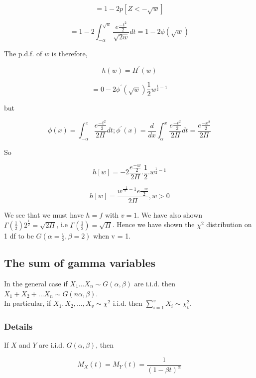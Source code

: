 \documentclass[12pt,a4paper]{article}
\theoremstyle{regla}
\theoremstyle{remark}
\theoremstyle{definition}
\theoremstyle{nonumberbreak}
\begin{document}
$$ = 1-2p [Z< - \sqrt{w}]$$

$$ = 1 - 2  \int_{-\alpha}^{\sqrt{w}} \frac{e \frac{-t^2}{2}} {\sqrt{2w}} dt = 1 - 2\phi (\sqrt{w})$$
 

The p.d.f. of $w$ is therefore,

$$h(w) = H ^\prime(w)$$

$$ = 0 - 2\phi ^\prime (\sqrt{w}) \frac{1} {2} w ^ {\frac{1} {2} -1}$$

but 

$$ \phi (x) = \int_{-\alpha}^{x} \frac{e \frac{-t^2}{2}} {2\Pi} dt ; \phi ^\prime (x) = \frac {d}{dx}\int_{\alpha}^{x}\frac{e \frac{-t^2}{2}} {2\Pi} dt = \frac{e \frac{-x^2}{2}} {2\Pi}$$

So 

$$ h[w] =  -2 \frac{e \frac{-w}{2}} {2\Pi}. \frac {1} {2} . w^{\frac {1}{2} -1} $$

 

$$ h[w] = \frac{w^ {\frac{-1}{2}-1} e \frac{-w}{2}} {2\Pi}, w > 0$$

We see that we must have $ h=f $ with $v = 1 $. We have also shown $ \Gamma (\frac {1}{2}) 2 ^\frac {1}{2} = \sqrt{2\Pi}$, i.e $ \Gamma (\frac {1}{2}) = \sqrt{\Pi}$. Hence we have shown the $\chi^2$ distribution on 1 df to be $G (\alpha = \frac {v}{2}, \beta = 2)$  when v = 1.


 


\subsection{The sum of gamma variables}
\begin{fbox}
\begin{minipage}{0.97\textwidth}
In the general case if $ X_1 \ldots X_n \sim G (\alpha, \beta)$ are i.i.d. then $ X_1 + X_2 + \ldots X_n \sim G (n\alpha, \beta)$.\\
 
In particular, if $ X_1, X_2 , \ldots, X_v \sim \chi^2$ i.i.d. then $ \sum_{i=1}^v X_i \sim \chi^2_{v}$.

\end{minipage}
\end{fbox}
\subsubsection{Details}
If $X$ and $Y$ are i.i.d. $G (\alpha, \beta)$, then
 
$$ M_X (t) = M_Y (t) = \frac {1} {(1- \beta t)^\alpha}$$
\end{document}
